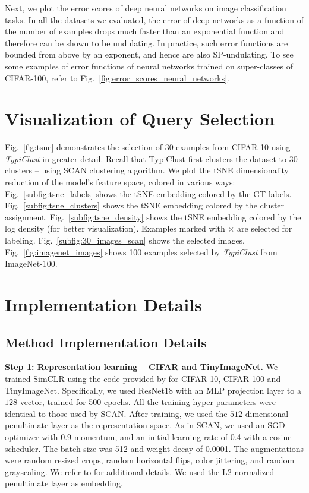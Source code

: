 \documentclass{article}
\newcommand{\myparagraph}[1]{\smallskip\noindent\textbf{#1}}
\begin{document}
Next, we plot the error scores of deep neural networks on image classification tasks. In all the datasets we evaluated, the error of deep networks as a function of the number of examples drops much faster than an exponential function and therefore can be shown to be undulating. In practice, such error functions are bounded from above by an exponent, and hence are also SP-undulating. To see some examples of error functions of neural networks trained on super-classes of CIFAR-100, refer to Fig.~\ref{fig:error_scores_neural_networks}.

\section{Visualization of Query Selection}












Fig.~\ref{fig:tsne} demonstrates the selection of $30$ examples from CIFAR-10 using \emph{TypiClust} in greater detail. Recall that TypiClust first clusters the dataset to $30$ clusters -- using SCAN clustering algorithm. We plot the tSNE dimensionality reduction of the model's feature space, colored in various ways: Fig.~\ref{subfig:tsne_labels} shows the tSNE embedding colored by the GT labels.  Fig.~\ref{subfig:tsne_clusters} shows the tSNE embedding colored by the cluster assignment.  Fig.~\ref{subfig:tsne_density} shows the tSNE embedding colored by the log density (for better visualization).  Examples marked with $\boldsymbol{\times}$ are selected for labeling. Fig.~\ref{subfig:30_images_scan} shows the selected images. Fig.~\ref{fig:imagenet_images} shows 100 examples selected by \emph{TypiClust} from ImageNet-100. 




\section{Implementation Details}
\subsection{Method Implementation Details}
\label{app:method_implementation_details}
\myparagraph{Step 1: Representation learning -- CIFAR and TinyImageNet.}
We trained SimCLR using the code provided by \citet{van2020scan} for CIFAR-10, CIFAR-100 and TinyImageNet. Specifically, we used ResNet18 with an MLP projection layer to a $128$ vector, trained for 500 epochs. All the training hyper-parameters were identical to those used by SCAN.
After training, we used the $512$ dimensional penultimate layer as the representation space.
As in SCAN, we used an SGD optimizer with 0.9 momentum, and an initial learning rate of 0.4 with a cosine scheduler. The batch size was 512 and weight decay of 0.0001.
The augmentations were random resized crops, random horizontal flips, color jittering, and random grayscaling. We refer to \citet{van2020scan} for additional details. We used the L2 normalized penultimate layer as embedding.
\end{document}
